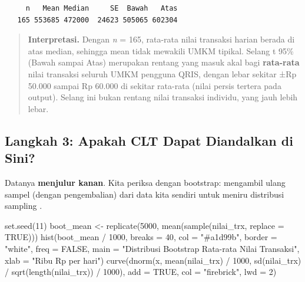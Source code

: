 \documentclass[
  indonesian,
  letterpaper,
]{book}
\newenvironment{Shaded}{\begin{snugshade}}{\end{snugshade}}
\newcommand{\AttributeTok}[1]{\textcolor[rgb]{0.40,0.45,0.13}{#1}}
\newcommand{\ConstantTok}[1]{\textcolor[rgb]{0.56,0.35,0.01}{#1}}
\newcommand{\DecValTok}[1]{\textcolor[rgb]{0.68,0.00,0.00}{#1}}
\newcommand{\FunctionTok}[1]{\textcolor[rgb]{0.28,0.35,0.67}{#1}}
\newcommand{\NormalTok}[1]{\textcolor[rgb]{0.00,0.23,0.31}{#1}}
\newcommand{\OtherTok}[1]{\textcolor[rgb]{0.00,0.23,0.31}{#1}}
\newcommand{\SpecialCharTok}[1]{\textcolor[rgb]{0.37,0.37,0.37}{#1}}
\newcommand{\StringTok}[1]{\textcolor[rgb]{0.13,0.47,0.30}{#1}}
\begin{document}
\begin{verbatim}
     n   Mean Median     SE  Bawah   Atas 
   165 553685 472000  24623 505065 602304 
\end{verbatim}

\begin{quote}
\textbf{Interpretasi.} Dengan \emph{n} = 165, rata-rata nilai transaksi
harian berada di atas median, sehingga mean tidak mewakili UMKM tipikal.
Selang t 95\% (Bawah sampai Atas) merupakan rentang yang masuk akal bagi
\textbf{rata-rata} nilai transaksi seluruh UMKM pengguna QRIS, dengan
lebar sekitar ±Rp 50.000 sampai Rp 60.000 di sekitar rata-rata (nilai
persis tertera pada output). Selang ini bukan rentang nilai transaksi
individu, yang jauh lebih lebar.
\end{quote}

\subsection{Langkah 3: Apakah CLT Dapat Diandalkan di
Sini?}\label{langkah-3-apakah-clt-dapat-diandalkan-di-sini}

Datanya \textbf{menjulur kanan}. Kita periksa dengan bootstrap:
mengambil ulang sampel (dengan pengembalian) dari data kita sendiri
untuk meniru distribusi sampling .

\begin{Shaded}
\begin{Highlighting}[]
\FunctionTok{set.seed}\NormalTok{(}\DecValTok{11}\NormalTok{)}
\NormalTok{boot\_mean }\OtherTok{\textless{}{-}} \FunctionTok{replicate}\NormalTok{(}\DecValTok{5000}\NormalTok{, }\FunctionTok{mean}\NormalTok{(}\FunctionTok{sample}\NormalTok{(nilai\_trx, }\AttributeTok{replace =} \ConstantTok{TRUE}\NormalTok{)))}
\FunctionTok{hist}\NormalTok{(boot\_mean }\SpecialCharTok{/} \DecValTok{1000}\NormalTok{, }\AttributeTok{breaks =} \DecValTok{40}\NormalTok{, }\AttributeTok{col =} \StringTok{"\#a1d99b"}\NormalTok{, }\AttributeTok{border =} \StringTok{"white"}\NormalTok{, }\AttributeTok{freq =} \ConstantTok{FALSE}\NormalTok{,}
\AttributeTok{main =} \StringTok{"Distribusi Bootstrap Rata{-}rata Nilai Transaksi"}\NormalTok{, }\AttributeTok{xlab =} \StringTok{"Ribu Rp per hari"}\NormalTok{)}
\FunctionTok{curve}\NormalTok{(}\FunctionTok{dnorm}\NormalTok{(x, }\FunctionTok{mean}\NormalTok{(nilai\_trx) }\SpecialCharTok{/} \DecValTok{1000}\NormalTok{, }\FunctionTok{sd}\NormalTok{(nilai\_trx) }\SpecialCharTok{/} \FunctionTok{sqrt}\NormalTok{(}\FunctionTok{length}\NormalTok{(nilai\_trx)) }\SpecialCharTok{/} \DecValTok{1000}\NormalTok{),}
\AttributeTok{add =} \ConstantTok{TRUE}\NormalTok{, }\AttributeTok{col =} \StringTok{"firebrick"}\NormalTok{, }\AttributeTok{lwd =} \DecValTok{2}\NormalTok{)}
\end{Highlighting}
\end{Shaded}
\end{document}
